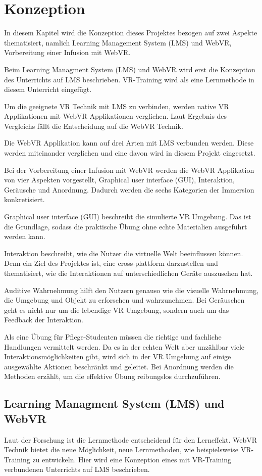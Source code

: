 \chapter{Konzeption}

In diesem Kapitel wird die Konzeption dieses Projektes bezogen auf zwei Aspekte thematisiert, namlich Learning Management System (LMS) und WebVR, Vorbereitung einer Infusion mit WebVR.

Beim Learning Managment System (LMS) und WebVR wird erst die Konzeption des Unterrichts auf LMS beschrieben. VR-Training wird als eine Lernmethode in diesem Unterricht eingefügt.

Um die geeignete VR Technik mit LMS zu verbinden, werden native VR Applikationen mit WebVR Applikationen verglichen. Laut Ergebnis des Vergleichs fällt die Entscheidung auf die WebVR Technik.

Die WebVR Applikation kann auf drei Arten mit LMS verbunden werden. Diese werden miteinander verglichen und eine davon wird in diesem Projekt eingesetzt.

Bei der Vorbereitung einer Infusion mit WebVR werden die WebVR Applikation von vier Aspekten vorgestellt, Graphical user interface (GUI), Interaktion, Geräusche und Anordnung. Dadurch werden die sechs Kategorien der Immersion \citep{28} konkretisiert.

Graphical user interface (GUI) beschreibt die simulierte VR Umgebung. Das ist die Grundlage, sodass die praktische Übung ohne echte Materialien ausgeführt werden kann.

Interaktion beschreibt, wie die Nutzer die virtuelle Welt beeinflussen können. Denn ein Ziel des Projektes ist, eine cross-plattform darzustellen und thematisiert, wie die Interaktionen auf unterschiedlichen Geräte auszusehen hat.

Auditive Wahrnehmung hilft den Nutzern genauso wie die visuelle Wahrnehmung, die Umgebung und Objekt zu erforschen und wahrzunehmen. Bei Geräuschen geht es nicht nur um die lebendige VR Umgebung, sondern auch um das Feedback der Interaktion.

Als eine Übung für Pflege-Studenten müssen die richtige und fachliche Handlungen vermittelt werden. Da es in der echten Welt aber unzählbar viele Interaktionsmöglichkeiten gibt, wird sich in der VR Umgebung auf einige ausgewählte Aktionen beschränkt und geleitet. Bei Anordnung werden die Methoden erzählt, um die effektive Übung reibungslos durchzuführen. 

\section{Learning Managment System (LMS) und WebVR}
Laut der Forschung ist die Lernmethode entscheidend für den Lerneffekt. WebVR Technik bietet die neue Möglichkeit, neue Lernmethoden, wie beispielsweise VR-Training zu entwickeln. Hier wird eine Konzeption eines mit VR-Training verbundenen Unterrichts auf LMS beschrieben.

